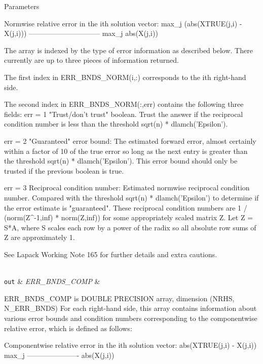 \begin{DoxyParams}[1]{Parameters}
\begin{DoxyVerb}
     Normwise relative error in the ith solution vector:
             max_j (abs(XTRUE(j,i) - X(j,i)))
            ------------------------------
                  max_j abs(X(j,i))

     The array is indexed by the type of error information as described
     below. There currently are up to three pieces of information
     returned.

     The first index in ERR_BNDS_NORM(i,:) corresponds to the ith
     right-hand side.

     The second index in ERR_BNDS_NORM(:,err) contains the following
     three fields:
     err = 1 "Trust/don't trust" boolean. Trust the answer if the
              reciprocal condition number is less than the threshold
              sqrt(n) * dlamch('Epsilon').

     err = 2 "Guaranteed" error bound: The estimated forward error,
              almost certainly within a factor of 10 of the true error
              so long as the next entry is greater than the threshold
              sqrt(n) * dlamch('Epsilon'). This error bound should only
              be trusted if the previous boolean is true.

     err = 3  Reciprocal condition number: Estimated normwise
              reciprocal condition number.  Compared with the threshold
              sqrt(n) * dlamch('Epsilon') to determine if the error
              estimate is "guaranteed". These reciprocal condition
              numbers are 1 / (norm(Z^{-1},inf) * norm(Z,inf)) for some
              appropriately scaled matrix Z.
              Let Z = S*A, where S scales each row by a power of the
              radix so all absolute row sums of Z are approximately 1.

     See Lapack Working Note 165 for further details and extra
     cautions.\end{DoxyVerb}
\\
\hline
\mbox{\tt out}  & {\em E\+R\+R\+\_\+\+B\+N\+D\+S\+\_\+\+C\+O\+M\+P} & \begin{DoxyVerb}          ERR_BNDS_COMP is DOUBLE PRECISION array, dimension (NRHS, N_ERR_BNDS)
     For each right-hand side, this array contains information about
     various error bounds and condition numbers corresponding to the
     componentwise relative error, which is defined as follows:

     Componentwise relative error in the ith solution vector:
                    abs(XTRUE(j,i) - X(j,i))
             max_j ----------------------
                         abs(X(j,i))


\end{DoxyVerb}
\end{DoxyParams}
